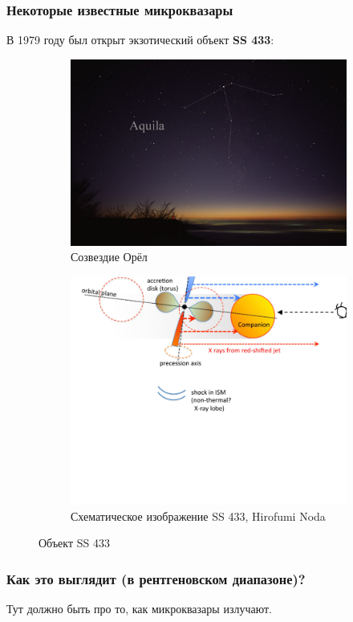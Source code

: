 \documentclass{beamer}
\begin{document}
\begin{frame}
	\frametitle{Некоторые известные микроквазары}
	В 1979 году был открыт экзотический объект \textbf{SS 433}:
	\begin{figure}[h]
		\begin{subfigure}{0.4\textwidth}
			\includegraphics[width=.9\linewidth]{resources/AquilaCC.jpg}
			\caption{Созвездие Орёл}
		\end{subfigure}
		\begin{subfigure}{0.4\textwidth}
			\includegraphics[width=.5\textwidth]{resources/ss-433-schematic-view.png}
			\caption{Схематическое изображение SS 433, Hirofumi Noda}
		\end{subfigure}

		\caption{Объект SS 433}
	\end{figure}

\end{frame}

\begin{frame}
	\frametitle{Как это выглядит (в рентгеновском диапазоне)?}
	Тут должно быть про то, как микроквазары излучают.
\end{frame}
\end{document}
